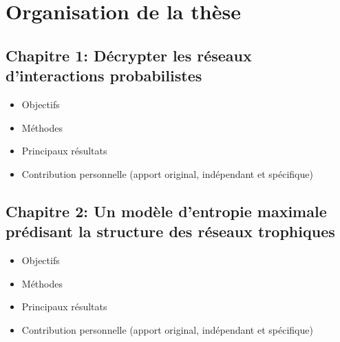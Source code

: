 
\section{Organisation de la thèse}

\subsection{Chapitre 1: Décrypter les réseaux d'interactions probabilistes} 

\begin{itemize}
    \item Objectifs
    \item Méthodes 
    \item Principaux résultats
    \item Contribution personnelle (apport original, indépendant et spécifique)
\end{itemize}

\subsection{Chapitre 2: Un modèle d'entropie maximale prédisant la structure des réseaux trophiques} 

\begin{itemize}
    \item Objectifs
    \item Méthodes 
    \item Principaux résultats
    \item Contribution personnelle (apport original, indépendant et spécifique)
\end{itemize}

\endinput
